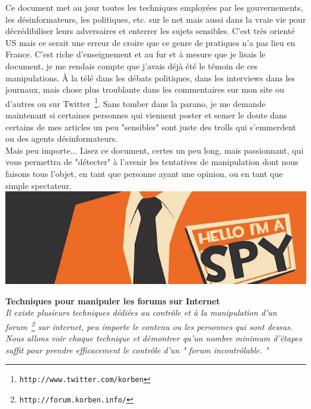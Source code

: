 \documentclass[11pt,twoside,a4paper]{article}
\begin{document}
Ce document met au jour toutes les techniques employ{\'e}es par les gouvernements, les d{\'e}sinformateurs, les politiques, etc. sur le net mais aussi dans la vraie vie pour d{\'e}cr{\'e}dibiliser leurs adversaires et enterrer les sujets sensibles. C'est tr{\`e}s orient{\'e} US mais ce serait une erreur de croire que ce genre de pratiques n'a pas lieu en France. C'est riche d'enseignement et au fur et {\`a} mesure que je lisais le document, je me rendais compte que j'avais d{\'e}j{\`a} {\'e}t{\'e} le t{\'e}moin de ces manipulations. {\`A} la t{\'e}l{\'e} dans les d{\'e}bats politiques, dans les interviews dans les journaux, mais chose plus troublante dans les commentaires sur mon site ou d'autres ou sur Twitter~\footnote{\texttt{http://www.twitter.com/korben}}. Sans tomber dans la parano, je me demande maintenant si certaines personnes qui viennent poster et semer le doute dans certains de mes articles un peu "sensibles" sont juste des trolls qui s'emmerdent ou des agents d{\'e}sinformateurs.~\\

Mais peu importe... Lisez ce document, certes un peu long, mais passionnant, qui vous permettra de "d{\'e}tecter" {\`a} l'avenir les tentatives de manipulation dont nous faisons tous l'objet, en tant que personne ayant une opinion, ou en tant que simple spectateur.~\\

\includegraphics[width=\textwidth]{img/wallpaper-406977.png}

\textbf{\Large Techniques pour manipuler les forums sur Internet}~\\

\emph{Il existe plusieurs techniques d{\'e}di{\'e}es au contr{\^o}le et {\`a} la manipulation d'un forum~\footnote{\texttt{http://forum.korben.info/}} sur internet, peu importe le contenu ou les personnes qui sont dessus. Nous allons voir chaque technique et d{\'e}montrer qu'un nombre minimum d'{\'e}tapes suffit pour prendre efficacement le contr{\^o}le d'un " forum incontr{\^o}lable. "}~\\
\end{document}
